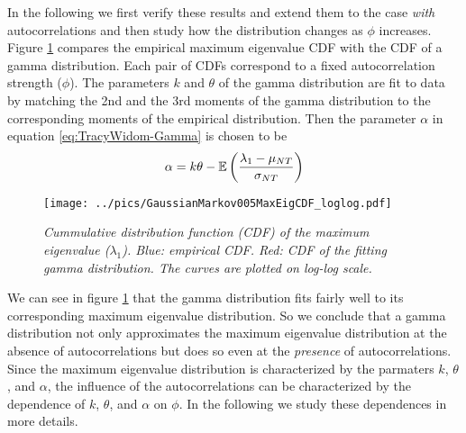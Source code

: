 In the following we first verify these results and extend them to the
case {\it with} autocorrelations and then study how the
distribution changes as $\phi$ increases. Figure
\ref{fig:GaussianMarkov005MaxEigCDF_loglog} compares the empirical
maximum eigenvalue CDF with the CDF of a gamma distribution. Each pair
of CDFs correspond to a fixed autocorrelation strength ($\phi$). The
parameters $k$ and $\theta$ of the gamma distribution are fit to
data by matching the 2nd and the 3rd moments of the gamma distribution
to the corresponding moments of the empirical distribution. Then the
parameter $\alpha$ in equation \ref{eq:TracyWidom-Gamma} is chosen to
be
\begin{equation*}
  \alpha = k\theta - \mathbb{E}\left({\lambda_1 - \mu_{NT} \over \sigma_{NT}}\right)
\end{equation*}

\begin{figure}
  \begin{center}
    \texttt{[image: ../pics/GaussianMarkov005MaxEigCDF\_loglog.pdf]}
  \end{center}
  \caption{\small \it Cummulative distribution function (CDF) of the maximum
    eigenvalue ($\lambda_1$). Blue: empirical CDF. Red: CDF of the
    fitting gamma distribution. The curves are plotted on log-log
    scale.}
  \label{fig:GaussianMarkov005MaxEigCDF_loglog}
\end{figure}

We can see in figure \ref{fig:GaussianMarkov005MaxEigCDF_loglog} that
the gamma distribution fits fairly well to its corresponding maximum
eigenvalue distribution. So we conclude that a gamma distribution not
only approximates the maximum eigenvalue distribution at the absence of
autocorrelations but does so even at the {\it presence} of
autocorrelations. Since the maximum eigenvalue distribution is
characterized by the parmaters $k$, $\theta$, and  $\alpha$, the
influence of the autocorrelations can be characterized by the
dependence of $k$, $\theta$, and  $\alpha$ on $\phi$. In the following
we study these dependences in more details.

